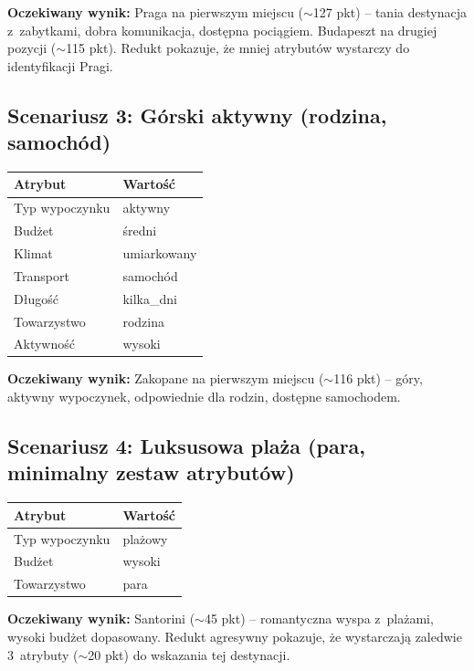 \documentclass[12pt,a4paper]{article}
\begin{document}
\textbf{Oczekiwany wynik:} Praga na pierwszym miejscu ($\sim$127 pkt) -- tania destynacja z~zabytkami, dobra komunikacja, dostępna pociągiem. Budapeszt na drugiej pozycji ($\sim$115 pkt). Redukt pokazuje, że mniej atrybutów wystarczy do identyfikacji Pragi.

\subsection{Scenariusz 3: Górski aktywny (rodzina, samochód)}

\begin{table}[H]
\centering
\begin{tabular}{ll}
\toprule
\textbf{Atrybut} & \textbf{Wartość} \\
\midrule
Typ wypoczynku & aktywny \\
Budżet & średni \\
Klimat & umiarkowany \\
Transport & samochód \\
Długość & kilka\_dni \\
Towarzystwo & rodzina \\
Aktywność & wysoki \\
\bottomrule
\end{tabular}
\end{table}

\textbf{Oczekiwany wynik:} Zakopane na pierwszym miejscu ($\sim$116 pkt) -- góry, aktywny wypoczynek, odpowiednie dla rodzin, dostępne samochodem.

\subsection{Scenariusz 4: Luksusowa plaża (para, minimalny zestaw atrybutów)}

\begin{table}[H]
\centering
\begin{tabular}{ll}
\toprule
\textbf{Atrybut} & \textbf{Wartość} \\
\midrule
Typ wypoczynku & plażowy \\
Budżet & wysoki \\
Towarzystwo & para \\
\bottomrule
\end{tabular}
\end{table}

\textbf{Oczekiwany wynik:} Santorini ($\sim$45 pkt) -- romantyczna wyspa z~plażami, wysoki budżet dopasowany. Redukt agresywny pokazuje, że wystarczają zaledwie 3~atrybuty ($\sim$20 pkt) do wskazania tej destynacji.
\end{document}
